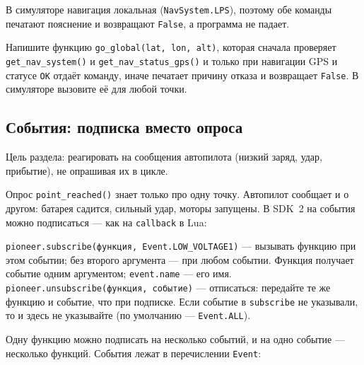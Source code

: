 В симуляторе навигация локальная (\verb|NavSystem.LPS|), поэтому обе команды печатают пояснение и возвращают \verb|False|, а программа не падает.

\begin{taskbox}
Напишите функцию \verb|go_global(lat, lon, alt)|, которая сначала проверяет \verb|get_nav_system()| и \verb|get_nav_status_gps()| и только при навигации GPS и статусе \texttt{OK} отдаёт команду, иначе печатает причину отказа и возвращает \verb|False|. В симуляторе вызовите её для любой точки.
\end{taskbox}

\subsection{События: подписка вместо опроса}

Цель раздела: реагировать на сообщения автопилота (низкий заряд, удар, прибытие), не опрашивая их в цикле.

Опрос \verb|point_reached()| знает только про одну точку. Автопилот сообщает и о другом: батарея садится, сильный удар, моторы запущены. В SDK~2 на события можно подписаться --- как на \verb|callback| в Lua:

\begin{codebox}
\verb|pioneer.subscribe(функция, Event.LOW_VOLTAGE1)| --- вызывать функцию при этом событии; без второго аргумента --- при любом событии. Функция получает событие одним аргументом; \verb|event.name| --- его имя.\\
\verb|pioneer.unsubscribe(функция, событие)| --- отписаться: передайте те же функцию и событие, что при подписке. Если событие в \verb|subscribe| не указывали, то и здесь не указывайте (по умолчанию --- \verb|Event.ALL|).
\end{codebox}

Одну функцию можно подписать на несколько событий, и на одно событие --- несколько функций. События лежат в перечислении \verb|Event|:

